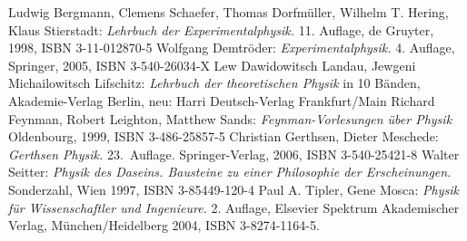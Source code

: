 \documentclass[titlepage, parkskip=full, twocolumn, landscape]{scrartcl}
\begin{document}
\begin{thebibliography}{7}
	 Ludwig Bergmann, Clemens Schaefer, Thomas Dorfmüller, Wilhelm T. Hering, Klaus Stierstadt: \emph{Lehrbuch der Experimentalphysik.} 11. Auflage, de Gruyter, 1998, ISBN 3-11-012870-5
	 Wolfgang Demtröder: \emph{Experimentalphysik.} 4. Auflage, Springer, 2005, ISBN 3-540-26034-X
	 Lew Dawidowitsch Landau, Jewgeni Michailowitsch Lifschitz: \emph{Lehrbuch der theoretischen Physik} in 10 Bänden, Akademie-Verlag Berlin, neu: Harri Deutsch-Verlag Frankfurt/Main
	 Richard Feynman, Robert Leighton, Matthew Sands: \emph{Feynman-Vorlesungen über Physik} Oldenbourg, 1999, ISBN 3-486-25857-5
	 Christian Gerthsen, Dieter Meschede: \emph{Gerthsen Physik.} 23.~Auflage. Springer-Verlag, 2006, ISBN 3-540-25421-8
	 Walter Seitter: \emph{Physik des Daseins. Bausteine zu einer Philosophie der Erscheinungen}. Sonderzahl, Wien 1997, ISBN 3-85449-120-4
	 Paul A. Tipler, Gene Mosca: \emph{Physik für Wissenschaftler und Ingenieure.} 2. Auflage, Elsevier Spektrum Akademischer Verlag, München/Heidelberg 2004, ISBN 3-8274-1164-5.
\end{thebibliography}
\end{document}
